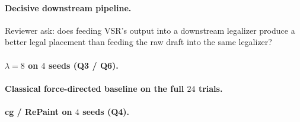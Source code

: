 \documentclass{article}
\begin{document}
\paragraph{Decisive downstream pipeline.}  Reviewer ask: does feeding
VSR's output into a downstream legalizer produce a better legal
placement than feeding the raw draft into the same legalizer?

\begin{table}[h]
\centering
\small

\caption{Decisive downstream pipeline experiment, $24$ trials.
Pipeline = raw $\to$ \texttt{cd-sched} legalizer (5000 SGD steps) vs.\
raw $\to$ VSR-post($\lambda{=}8$) $\to$ \texttt{cd-sched}.
$\Delta v\,\%$ is the residual violation count change relative to
the raw draft; $\Delta h_m\,\%$ is macros-only HPWL change;
$\Delta h_f\,\%$ is full-design HPWL change with cells at
\texttt{.pl}; $t$ is total wall-clock.  Raw rows:
\texttt{results/vsr\_extra/round2\_review.json}.}
\label{tab:supp-downstream-pipeline}
\end{table}

\paragraph{$\lambda{=}8$ on $4$ seeds (Q3 / Q6).}

\begin{table}[h]
\centering
\small

\caption{VSR-post($\lambda{=}8$) on the same $24$ trials as
Table~1 (4 seeds per circuit).  ``residual $v_\text{post}$'' is the
absolute violation count remaining after VSR; even at $\lambda{=}8$,
no trial reaches $v=0$.}
\label{tab:supp-lambda8-main}
\end{table}

\paragraph{Classical force-directed baseline on the full $24$ trials.}

\begin{table}[h]
\centering
\small

\caption{FD-pure (repulsion + boundary, no mask) and FD+spring
(\,+\,degree-normalised net-spring weight $1.0$) compared to
VSR-post($\lambda{=}8$) on the same $6$ circuits $\times$ $4$ seeds
as Table~1.  Replaces the earlier $15$-draft cached evaluation.}
\label{tab:supp-classical-24}
\end{table}

\paragraph{cg / RePaint on $4$ seeds (Q4).}
\end{document}

